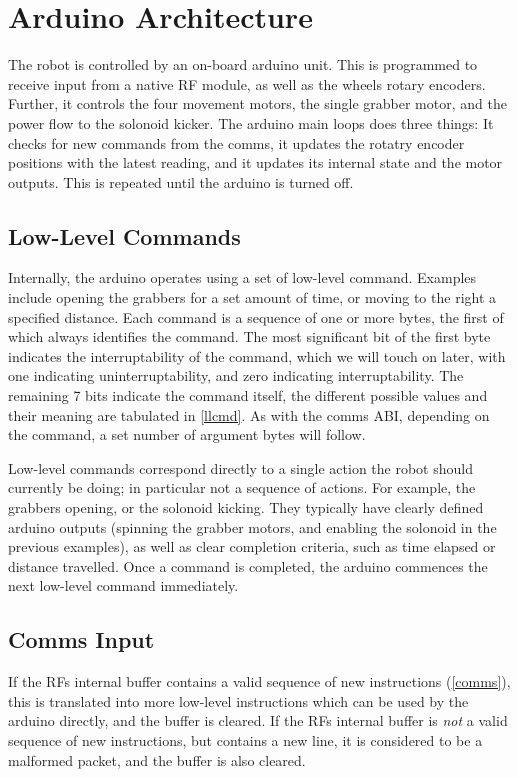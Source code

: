 \section{Arduino Architecture}

The robot is controlled by an on-board arduino unit. This is programmed to
receive input from a native RF module, as well as the wheels rotary encoders.
Further, it controls the four movement motors, the single grabber motor, and
the power flow to the solonoid kicker. The arduino main loops does three
things: It checks for new commands from the comms, it updates the rotatry
encoder positions with the latest reading, and it updates its internal state
and the motor outputs. This is repeated until the arduino is turned off.

\subsection{Low-Level Commands}

Internally, the arduino operates using a set of low-level command. Examples
include opening the grabbers for a set amount of time, or moving to the right a
specified distance. Each command is a sequence of one or more bytes, the first
of which always identifies the command. The most significant bit of the first
byte indicates the interruptability of the command, which we will touch on
later, with one indicating uninterruptability, and zero indicating
interruptability. The remaining 7 bits indicate the command itself, the
different possible values and their meaning are tabulated in \cref{llcmd}. As
with the comms ABI, depending on the command, a set number of argument bytes
will follow.

Low-level commands correspond directly to a single action the robot should
currently be doing; in particular not a sequence of actions. For example, the
grabbers opening, or the solonoid kicking. They typically have clearly defined
arduino outputs (spinning the grabber motors, and enabling the solonoid in the
previous examples), as well as clear completion criteria, such as time elapsed
or distance travelled. Once a command is completed, the arduino commences the
next low-level command immediately.

\subsection{Comms Input}

If the RFs internal buffer contains a valid sequence of new instructions
(\cref{comms}), this is translated into more low-level instructions which can
be used by the arduino directly, and the buffer is cleared. If the RFs internal
buffer is \textit{not} a valid sequence of new instructions, but contains a new
line, it is considered to be a malformed packet, and the buffer is also
cleared.

